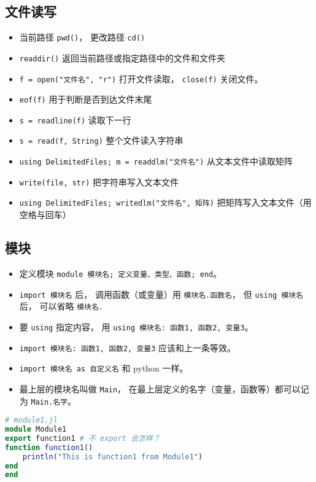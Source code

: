 \subsection{文件读写}
\begin{itemize}
\item 当前路径 \verb`pwd()`， 更改路径 \verb`cd()`
\item \verb`readdir()` 返回当前路径或指定路径中的文件和文件夹
\item \verb`f = open("文件名", "r")` 打开文件读取， \verb`close(f)` 关闭文件。
\item \verb`eof(f)` 用于判断是否到达文件末尾
\item \verb`s = readline(f)` 读取下一行
\item \verb`s = read(f, String)` 整个文件读入字符串
\item \verb`using DelimitedFiles; m = readdlm("文件名")` 从文本文件中读取矩阵
\item \verb`write(file, str)` 把字符串写入文本文件
\item \verb`using DelimitedFiles; writedlm("文件名", 矩阵)` 把矩阵写入文本文件（用空格与回车）
\end{itemize}

\subsection{模块}
\begin{itemize}
\item 定义模块 \verb`module 模块名; 定义变量、类型、函数; end`。
\item \verb`import 模块名` 后， 调用函数（或变量）用 \verb`模块名.函数名`， 但 \verb`using 模块名` 后， 可以省略 \verb`模块名.`
\item 要 \verb`using` 指定内容， 用 \verb`using 模块名: 函数1, 函数2, 变量3`。
\item \verb`import 模块名: 函数1, 函数2, 变量3` 应该和上一条等效。
\item \verb`import 模块名 as 自定义名` 和 python 一样。
\item 最上层的模块名叫做 \verb`Main`， 在最上层定义的名字（变量，函数等）都可以记为 \verb`Main.名字`。
\end{itemize}

\begin{lstlisting}[language=julia]
# module1.jl
module Module1
export function1 # 不 export 会怎样？
function function1()
    println("This is function1 from Module1")
end
end
\end{lstlisting}

